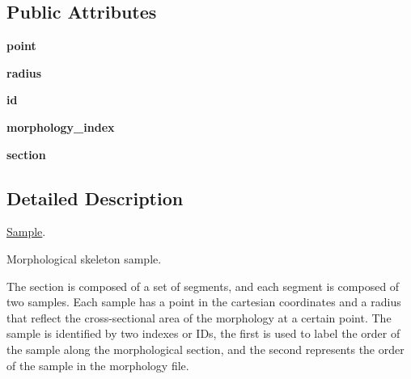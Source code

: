 \subsection*{Public Attributes}
\begin{DoxyCompactItemize}
\item 
{\bfseries point}\hypertarget{classmeshy_1_1neuromorphovis_1_1skeleton_1_1structure_1_1sample_1_1Sample_a8ef6608b183a1266f2309552e709a7a0}{}\label{classmeshy_1_1neuromorphovis_1_1skeleton_1_1structure_1_1sample_1_1Sample_a8ef6608b183a1266f2309552e709a7a0}

\item 
{\bfseries radius}\hypertarget{classmeshy_1_1neuromorphovis_1_1skeleton_1_1structure_1_1sample_1_1Sample_a2b5119bba82c9b7d4b2494cdbdc989f6}{}\label{classmeshy_1_1neuromorphovis_1_1skeleton_1_1structure_1_1sample_1_1Sample_a2b5119bba82c9b7d4b2494cdbdc989f6}

\item 
{\bfseries id}\hypertarget{classmeshy_1_1neuromorphovis_1_1skeleton_1_1structure_1_1sample_1_1Sample_aeee09f81f9898c356ed29b3fdc329874}{}\label{classmeshy_1_1neuromorphovis_1_1skeleton_1_1structure_1_1sample_1_1Sample_aeee09f81f9898c356ed29b3fdc329874}

\item 
{\bfseries morphology\+\_\+index}\hypertarget{classmeshy_1_1neuromorphovis_1_1skeleton_1_1structure_1_1sample_1_1Sample_ac039cb09cc9db8ef423f779f5b5ebf88}{}\label{classmeshy_1_1neuromorphovis_1_1skeleton_1_1structure_1_1sample_1_1Sample_ac039cb09cc9db8ef423f779f5b5ebf88}

\item 
{\bfseries section}\hypertarget{classmeshy_1_1neuromorphovis_1_1skeleton_1_1structure_1_1sample_1_1Sample_a26b7f0dfe2ec53440756681ed74dc002}{}\label{classmeshy_1_1neuromorphovis_1_1skeleton_1_1structure_1_1sample_1_1Sample_a26b7f0dfe2ec53440756681ed74dc002}

\end{DoxyCompactItemize}


\subsection{Detailed Description}
\hyperlink{classmeshy_1_1neuromorphovis_1_1skeleton_1_1structure_1_1sample_1_1Sample}{Sample}. 

\begin{DoxyVerb}Morphological skeleton sample.

The section is composed of a set of segments, and each segment is composed of two samples.
Each sample has a point in the cartesian coordinates and a radius that reflect the
cross-sectional area of the morphology at a certain point. The sample is identified by
two indexes or IDs, the first is used to label the order of the sample along the
morphological section, and the second represents the order of the sample in the morphology
file.
\end{DoxyVerb}
 

